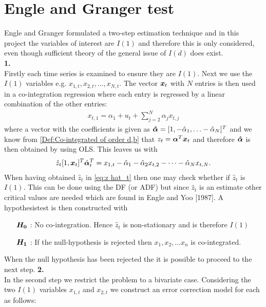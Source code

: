 \section{Engle and Granger test}
Engle and Granger formulated a two-step estimation technique and in this project the variables of interest are $I(1)$ and therefore this is only considered, even though sufficient theory of the general issue of $I(d)$ does exist. \\
\indent\indent \textbf{1.}\\ 
Firstly each time series is examined to ensure they are $I(1)$. Next we use the $I(1)$ variables e.g. $x_{1,t},x_{2,t},\ldots,x_{N,t}$. The vector $\boldsymbol{x}_t$ with $N$ entries is then used in a co-integration regression where each entry is regressed by a linear combination of the other entries:
\begin{align}\label{eq:regression}
    x_{t,1}=\alpha_1+u_t+\sum^N_{j=2}\alpha_j x_{t,j}
\end{align}
where a vector with the coefficients is given as $\boldsymbol{\hat{\alpha}}=[1, -\hat{\alpha}_1,\ldots-\hat{\alpha}_N]^T$ and we know from \ref{Def:Co-integrated of order d,b} that $z_t=\boldsymbol{\alpha}^T\boldsymbol{x}_t$ and therefore $\boldsymbol{\hat{\alpha}}$ is then obtained by using OLS. This leaves us with
\begin{align}\label{eq:z hat_t}
    \hat{z}_t[1, \boldsymbol{x}_t]^T\hat{\boldsymbol{\alpha}}_t^T=x_{1,t}-\hat{\alpha}_{1}-\hat{\alpha}_{2}x_{t,2}-\cdots-\hat{\alpha}_{N}x_{t,N}.
\end{align}
When having obtained $\hat{z}_t$ in \eqref{eq:z hat_t} then one may check whether if $\hat{z}_t$ is $I(1)$. This can be done using the DF (or ADF) but since $\hat{z}_t$ is an estimate other critical values are needed which are found in Engle and Yoo [1987]. A hypothesistest is then constructed with
\begin{itemize}
\centering
    \item[$\boldsymbol{H_0}$] : No co-integration. Hence $\hat{z}_t$ is non-stationary and is therefore $I(1)$
    \item [$\boldsymbol{H_1}$] : If the null-hypothesis is rejected then $x_1,x_2,\ldots x_n$  is co-integrated.
\end{itemize}
When the null hypothesis has been rejected the it is possible to proceed to the next step.
\newline{}
\newline
\indent\indent \textbf{2.}\\
In the second step we restrict the problem to a bivariate case. Considering the two $I(1)$ variables $x_{1,t}$ and $x_{2,t}$ we construct an error correction model for each as follows:
